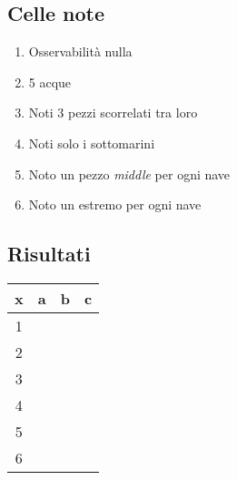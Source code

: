 \documentclass[11pt]{article}
\begin{document}
\subsection{Celle note}
\begin{enumerate}
    \item Osservabilità nulla
    \item 5 acque 
    \item Noti 3 pezzi scorrelati tra loro
    \item Noti solo i sottomarini
    \item Noto un pezzo \emph{middle} per ogni nave
    \item Noto un estremo per ogni nave
\end{enumerate}

\subsection{Risultati}
\begin{table}[H]
    \begin{tabular}{|c|c|c|c|}
    \hline
    x & a & b & c \\ \hline \hline
    1 &  &  &  \\ \hline
    2 &  &  &  \\ \hline
    3 &  &  &  \\ \hline
    4 &  &  &  \\ \hline
    5 &  &  &  \\ \hline
    6 &  &  &  \\ \hline
    \end{tabular}
\end{table}
\end{document}
